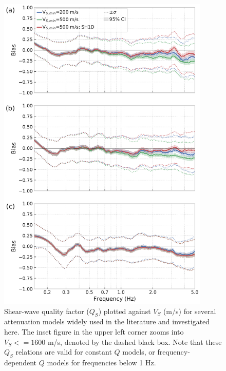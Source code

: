 \begin{figure}[!ht]
  \centering
  \includegraphics[width=0.9\textwidth,height=0.85\textheight,keepaspectratio]{figures/figure_highf_S1.pdf}
  \caption{
  Shear-wave quality factor ($Q_S$) plotted against $V_S$ (m/s) for several attenuation models widely used in the literature  and investigated here. The inset figure in the upper left corner zooms into $V_S <= 1600$ m/s, denoted by the dashed black box. Note that these $Q_S$ relations are valid for constant $Q$ models, or frequency-dependent $Q$ models for frequencies below 1 Hz.}
  \label{fig:highf-A1}
\end{figure}
\clearpage

